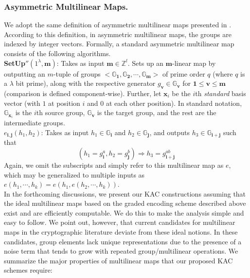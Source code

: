 \subsubsection{Asymmetric Multilinear Maps.} We adopt the same definition of asymmetric multilinear maps presented in \cite{garg2013candidate}. According to this definition, in asymmetric multilinear maps, the groups are indexed by integer vectors. Formally, a standard asymmetric multilinear map consists of the following algorithms.\\

\noindent\textbf{SetUp}$''(1^\lambda,\mathbf{m})$: Takes as input $\mathbf{m}\in\mathbb{Z}^l$. Sets up an $\mathbf{m}$-linear map by outputting an $m$-tuple of groups $<\mathbb{G}_{\mathbf{1}},\mathbb{G}_{\mathbf{2}},\cdots,\mathbb{G}_{\mathbf{m}}>$ of prime order $q$ (where $q$ is a $\lambda$ bit prime), along with the respective generator $g_{\mathbf{v}}\in\mathbb{G}_{\mathbf{v}}$ for $\mathbf{1}\leq \mathbf{v}\leq \mathbf{m}$(comparison is defined component-wise). Further, let $\mathbf{x}_i$ be the $i$th \emph{standard} basis vector (with $1$ at position $i$ and $0$ at each other position). In standard notation, $\mathbb{G}_{\mathbf{x}_i}$ is the $i$th source group, $\mathbb{G}_{\mathbf{v}}$ is the target group, and the rest are the intermediate groups.\\

\noindent$e_{\mathbf{i},\mathbf{j}}(h_1,h_2)$: Takes as input $h_1\in\mathbb{G}_\mathbf{i}$ and $h_2\in\mathbb{G}_\mathbf{j}$, and outputs $h_3\in\mathbb{G}_\mathbf{i+j}$ such that
\begin{equation}
 (h_1=g_\mathbf{i}^a,h_2=g_\mathbf{j}^b)\Rightarrow h_3=g_\mathbf{i+j}^{ab}\nonumber
\end{equation}
\noindent Again, we omit the subscripts and simply refer to this multilinear map as $e$, which may be generalized to multiple inputs as $e(h_1,\cdots,h_k)=e(h_1,e(h_2,\cdots,h_k))$.\\ 

In the forthcoming discussions, we present our KAC constructions assuming that the ideal multilinear maps based on the graded encoding scheme described above exist and are efficiently computable. We do this to make the analysis simple and easy to follow. We point out, however, that current candidates for multilinear maps in the cryptographic literature deviate from these ideal notions. In these candidates, group elements lack unique representations due to the presence of a noise term that tends to grow with repeated group/multilinear operations. We summarize the major properties of multilinear maps that our proposed KAC schemes require:

